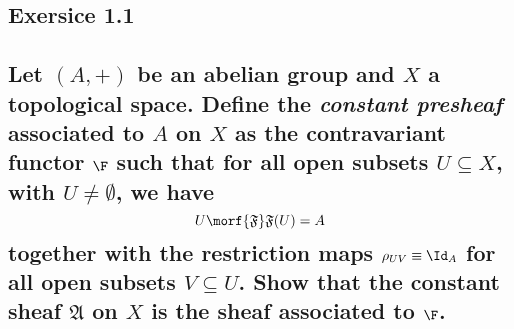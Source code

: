 \subsection*{Exersice 1.1}
\subsection*{Let $(A,+)$ be an abelian group and $X$ a topological space.
Define the \emph{constant presheaf} associated to $A$ on $X$ as the
contravariant functor $\F$ such that for all open subsets $U\subseteq X$,
with $U\neq\emptyset$, we have%
\[
	U\morf{\mathfrak{F}}\mathfrak{F}(U)=A
\]
together with the restriction maps $\rho_{UV}\equiv\Id_{A}$ for all open
subsets $V\subseteq U$. Show that the constant sheaf $\mathfrak{A}$ on $X$
is the sheaf associated to $\F$.} 

